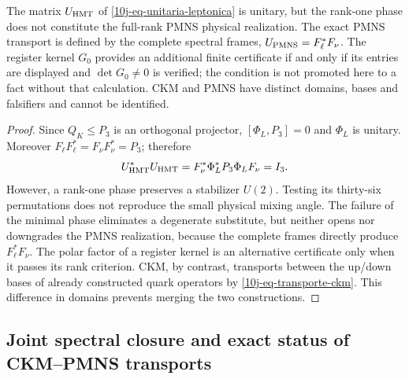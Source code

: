 \begin{proposition}
\label{10j-prop-ckm-pmns}
The matrix \(U_{\rm HMT}\) of \eqref{10j-eq-unitaria-leptonica} is unitary, but the rank-one phase does not constitute the full-rank PMNS physical realization. The exact PMNS transport is defined by the complete spectral frames, \(U_{\rm PMNS}=F_\ell^*F_\nu\). The register kernel \(G_0\) provides an additional finite certificate if and only if its entries are displayed and \(\det G_0\ne0\) is verified; the condition is not promoted here to a fact without that calculation. CKM and PMNS have distinct domains, bases and falsifiers and cannot be identified.
\end{proposition}

\begin{proof}
Since \(Q_K\leq P_3\) is an orthogonal projector, \([\Phi_L,P_3]=0\) and \(\Phi_L\) is unitary. Moreover \(F_\ell F_\ell^*=F_\nu F_\nu^*=P_3\); therefore
\[
 U_{\rm HMT}^*U_{\rm HMT}
 =F_\nu^*\Phi_L^*P_3\Phi_LF_\nu=I_3.
\]
However, a rank-one phase preserves a stabilizer \(U(2)\). Testing its thirty-six permutations does not reproduce the small physical mixing angle. The failure of the minimal phase eliminates a degenerate substitute, but neither opens nor downgrades the PMNS realization, because the complete frames directly produce \(F_\ell^*F_\nu\). The polar factor of a register kernel is an alternative certificate only when it passes its rank criterion. CKM, by contrast, transports between the up/down bases of already constructed quark operators by \eqref{10j-eq-transporte-ckm}. This difference in domains prevents merging the two constructions.
\end{proof}

\subsection{Joint spectral closure and exact status of CKM--PMNS transports}
\label{10j-sec-cierre-espectral-mezclas}

